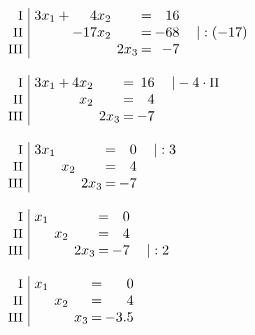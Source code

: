 \begin{equation*}
\begin{array}{l}
\begin{array}{r|rcrcrcrl}
\end{array}
\\ \\
\setlength{\arraycolsep}{1pt}
\begin{array}{r|rcrcrcrl}
    \text{\small I } &\; 3x_{1} & + &   4x_{2} &  &        & = &  16 &              \\
   \text{\small II } &\;        &   & -17x_{2} &  &        & = & -68 & \quad|:(-17) \\
  \text{\small III } &\;        &   &          &  & 2x_{3} & = &  -7 &                
\end{array}
\\ \\
\setlength{\arraycolsep}{1pt}
\begin{array}{r|rcrcrcrl}
    \text{\small I } &\; 3x_{1} & + & 4x_{2} &  &        & = & 16 & \quad|-4\cdot\text{\small II} \\
   \text{\small II } &\;        &   &  x_{2} &  &        & = &  4 &                               \\
  \text{\small III } &\;        &   &        &  & 2x_{3} & = & -7 &                                 
\end{array}
\\ \\
\setlength{\arraycolsep}{1pt}
\begin{array}{r|rcrcrcrl}
    \text{\small I } &\; 3x_{1} &  &       &  &        & = &  0 & \quad|:3 \\
   \text{\small II } &\;        &  & x_{2} &  &        & = &  4 &          \\
  \text{\small III } &\;        &  &       &  & 2x_{3} & = & -7 &            
\end{array}
\\ \\
\setlength{\arraycolsep}{1pt}
\begin{array}{r|rcrcrcrl}
    \text{\small I } &\; x_{1} &  &       &  &        & = &  0 &          \\
   \text{\small II } &\;       &  & x_{2} &  &        & = &  4 &          \\
  \text{\small III } &\;       &  &       &  & 2x_{3} & = & -7 & \quad|:2   
\end{array}
\\ \\
\setlength{\arraycolsep}{1pt}
\begin{array}{r|rcrcrcrl}
    \text{\small I } &\; x_{1} &  &       &  &       & = &    0 & \\
   \text{\small II } &\;       &  & x_{2} &  &       & = &    4 & \\
  \text{\small III } &\;       &  &       &  & x_{3} & = & -3.5 &   
\end{array}
\end{array}
\end{equation*}

